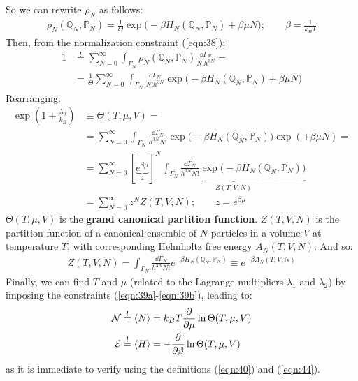 \documentclass[../../main.tex]{subfiles}
\begin{document}
So we can rewrite $\rho_N$ as follows:
\begin{align}\label{eqn:42}
    \rho_N(\mathbb{Q}_N, \mathbb{P}_N) = \frac{1}{\Theta} \exp \Big(-\beta H_N(\mathbb{Q}_N, \mathbb{P}_N) + \beta \mu N \Big); \qquad \beta = \frac{1}{k_B T} 
\end{align}
Then, from the normalization constraint (\ref{eqn:38}):
\begin{align*}
    1 &\overset{!}{=}  \sum_{N=0}^\infty \int_{\Gamma_N} \rho_N(\mathbb{Q}_N, \mathbb{P}_N) \frac{\dd{\Gamma_N}}{N! h^{3N}} =\\
    &= \frac{1}{\Theta} \sum_{N=0}^\infty \int_{\Gamma_N} \frac{\dd{\Gamma_N}}{N! h^{3N}} \exp \Big(-\beta H_N(\mathbb{Q}_N, \mathbb{P}_N) + \beta \mu N \Big)
\end{align*}
Rearranging:
\begin{align} \nonumber
    \exp\left(1+ \frac{\lambda_0}{k_B} \right) &\equiv \Theta(T, \mu, V) =\\ \nonumber
    &= \sum_{N=0}^\infty \int_{\Gamma_N} \frac{\dd{\Gamma_N}}{h^{3N}N!} \exp \Big(-\beta H_N(\mathbb{Q}_N, \mathbb{P}_N)\Big)\exp ( + \beta \mu N )=\\
    &= \sum_{N=0}^\infty [\underbrace{e^{\beta \mu}}_{z}]^N \underbrace{\int_{\Gamma_N} \frac{\dd{\Gamma_N}}{h^{3N} N!} \exp \Big( -\beta H_N(\mathbb{Q}_N, \mathbb{P}_N)\Big)}_{Z(T,V,N)} \\
    &=  \sum_{N=0}^\infty z^N Z(T,V,N); \qquad z=e^{\beta \mu} \label{eqn:44}
\end{align}
$\Theta(T,\mu,V)$ is the \textbf{grand canonical partition function}. $Z(T,V,N)$ is the partition function of a canonical ensemble of $N$ particles in a volume $V$ at temperature $T$, with corresponding Helmholtz free energy $A_N(T,V,N)$:
And so:
\begin{align}\label{eqn:46}
    Z(T,V,N) = \int_{\Gamma_N} \frac{\dd{\Gamma_N}}{h^{3N}N!} e^{-\beta H_N(\mathbb{Q}_N, \mathbb{P}_N)} \equiv e^{-\beta A_N(T, V, N)} 
\end{align}
Finally, we can find $T$ and $\mu$ (related to the Lagrange multipliers $\lambda_1$ and $\lambda_2$) by imposing the constraints (\ref{eqn:39a}-\ref{eqn:39b}), leading to:
\begin{align}\label{eqn:47}
    \mathcal{N} &\overset{!}{=}  \langle N \rangle = k_B T \pdv{\mu}\ln \Theta(T, \mu, V)\\
    \mathcal{E} &\overset{!}{=}  \langle H \rangle = - \pdv{\beta} \ln \Theta(T, \mu, V) \label{eqn:48}
\end{align}
as it is immediate to verify using the definitions (\ref{eqn:40}) and (\ref{eqn:44}).
\end{document}
